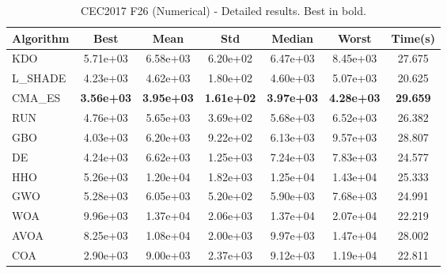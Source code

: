 \begin{table}[H]
\centering\small
\caption{CEC2017 F26 (Numerical) - Detailed results. Best in bold.}
\label{tab:cec2017_F26}
\begin{tabular}{lcccccc}
\toprule
\textbf{Algorithm} & \textbf{Best} & \textbf{Mean} & \textbf{Std} & \textbf{Median} & \textbf{Worst} & \textbf{Time(s)} \\
\midrule
KDO & 5.71e+03 & 6.58e+03 & 6.20e+02 & 6.47e+03 & 8.45e+03 & 27.675 \\
L_SHADE & 4.23e+03 & 4.62e+03 & 1.80e+02 & 4.60e+03 & 5.07e+03 & 20.625 \\
CMA_ES & \textbf{3.56e+03} & \textbf{3.95e+03} & \textbf{1.61e+02} & \textbf{3.97e+03} & \textbf{4.28e+03} & \textbf{29.659} \\
RUN & 4.76e+03 & 5.65e+03 & 3.69e+02 & 5.68e+03 & 6.52e+03 & 26.382 \\
GBO & 4.03e+03 & 6.20e+03 & 9.22e+02 & 6.13e+03 & 9.57e+03 & 28.807 \\
DE & 4.24e+03 & 6.62e+03 & 1.25e+03 & 7.24e+03 & 7.83e+03 & 24.577 \\
HHO & 5.26e+03 & 1.20e+04 & 1.82e+03 & 1.25e+04 & 1.43e+04 & 25.333 \\
GWO & 5.28e+03 & 6.05e+03 & 5.20e+02 & 5.90e+03 & 7.68e+03 & 24.991 \\
WOA & 9.96e+03 & 1.37e+04 & 2.06e+03 & 1.37e+04 & 2.07e+04 & 22.219 \\
AVOA & 8.25e+03 & 1.08e+04 & 2.00e+03 & 9.97e+03 & 1.47e+04 & 28.002 \\
COA & 2.90e+03 & 9.00e+03 & 2.37e+03 & 9.12e+03 & 1.19e+04 & 22.811 \\
\bottomrule
\end{tabular}
\end{table}

